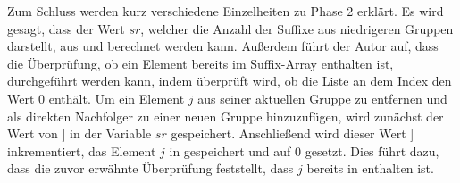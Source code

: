 Zum Schluss werden kurz verschiedene Einzelheiten zu Phase 2 erklärt. 
Es wird gesagt, dass der Wert $sr$, welcher die Anzahl der Suffixe aus niedrigeren Gruppen darstellt, aus \sa und \isa berechnet werden kann. 
Außerdem führt der Autor auf, dass die Überprüfung, ob ein Element bereits im Suffix-Array enthalten ist, durchgeführt werden kann, indem überprüft wird, ob die Liste \isa an dem Index den Wert 0 enthält. 
Um ein Element $j$ aus seiner aktuellen Gruppe zu entfernen und als direkten Nachfolger zu einer neuen Gruppe hinzuzufügen, wird zunächst der Wert von \sa[\isa[$j$]] in der Variable $sr$ gespeichert. 
Anschließend wird dieser Wert \sa[\isa[$j$]] inkrementiert, das Element $j$ in \sa[$sr$] gespeichert und \isa[$j$] auf 0 gesetzt. 
Dies führt dazu, dass die zuvor erwähnte Überprüfung feststellt, dass $j$ bereits in \sa enthalten ist.
